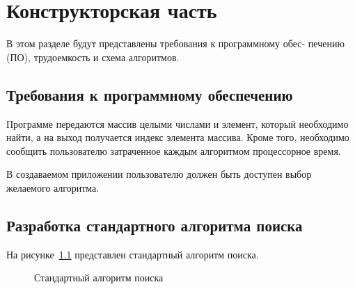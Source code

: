 \chapter{Конструкторская часть}

В этом разделе будут представлены требования к программному обес-
печению (ПО), трудоемкость и схема алгоритмов.

\section{Требования к программному обеспечению}

Программе передаются массив целыми числами и элемент, который необходимо найти, а на выход получается индекс элемента массива. Кроме того, необходимо сообщить пользователю затраченное каждым алгоритмом процессорное время.

В создаваемом приложении пользователю должен быть доступен выбор желаемого алгоритма.

\section{Разработка стандартного алгоритма поиска}

На рисунке~\ref{fig:standart} представлен стандартный алгоритм поиска.

\begin{figure}[h!]
	\caption{Стандартный алгоритм поиска}
	\label{fig:standart}
\end{figure}

